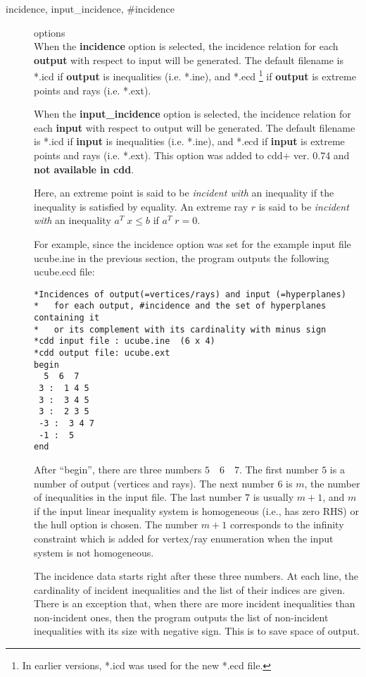\documentclass[11pt]{article}
\begin{document}
\begin{description}
\item[incidence, input\_incidence,  \#incidence] options\\
When the {\bf incidence} option is selected, the incidence relation for
each {\bf output} with respect to input will be generated.    The default filename
is *.icd  if {\bf output} is inequalities (i.e. *.ine), and *.ecd  
\footnote {In earlier versions, *.icd was used for the new *.ecd file.}
if {\bf output} is extreme points and
rays (i.e. *.ext).

When the {\bf input\_incidence} option is selected, the incidence relation for
each {\bf input} with respect to output will be generated.    The default filename
is *.icd  if {\bf input} is inequalities (i.e. *.ine), and *.ecd  
if {\bf input} is extreme points and
rays (i.e. *.ext).  This option was added to cdd+ ver. 0.74 and
{\bf not available in cdd\/}.


Here, an extreme point is said to be 
{\em incident with\/} an inequality if the inequality is satisfied by equality.
An extreme ray $r$ is said to be {\em incident with\/} 
an inequality $a^T \; x \le b$ if  $a^T \; r = 0$.  

For example,
since the incidence option was set for the example input file ucube.ine in
the previous section, the program outputs the following ucube.ecd file:
\begin{verbatim}
*Incidences of output(=vertices/rays) and input (=hyperplanes)
*   for each output, #incidence and the set of hyperplanes containing it
*   or its complement with its cardinality with minus sign
*cdd input file : ucube.ine  (6 x 4)
*cdd output file: ucube.ext
begin
  5  6  7
 3 :  1 4 5
 3 :  3 4 5
 3 :  2 3 5
 -3 :  3 4 7
 -1 :  5
end
\end{verbatim}
After ``begin'', there are three numbers $5 \quad 6 \quad 7$.
The first number $5$ is a number of output (vertices and rays).
The next number $6$ is $m$, the number of inequalities in the input file.
The last number $7$ is usually $m+1$, and $m$ if the input linear inequality
system is homogeneous (i.e., has zero RHS) or the hull option is chosen.
The number $m+1$ corresponds to the infinity constraint which is added
for vertex/ray enumeration when the input system is not homogeneous.

The incidence data starts right after these three numbers.
At each line, the cardinality of incident inequalities and
the list of their indices are given.  There is an exception that, when
there are more incident inequalities than non-incident ones, then the program
outputs the list of non-incident inequalities with its
size with negative sign.  This is to save space of output.


\end{description}
\end{document}
